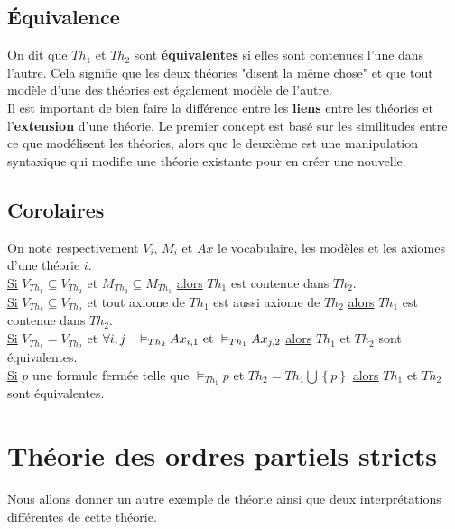 \subsection*{Équivalence}
On dit que $Th_1$ et $Th_2$ sont \textbf{équivalentes} si elles sont contenues l'une dans l'autre. Cela signifie que les deux théories "disent la même chose" et que tout modèle d'une des théories est également modèle de l'autre.\\

Il est important de bien faire la différence entre les \textbf{liens} entre les théories et l'\textbf{extension} d'une théorie. Le premier concept est basé sur les similitudes entre ce que modélisent les théories, alors que le deuxième est une manipulation syntaxique qui modifie une théorie existante pour en créer une nouvelle.

\subsection*{Corolaires}
On note respectivement $V_i$, $M_i$ et $Ax$ le vocabulaire, les modèles et les axiomes d'une théorie $i$. \\

\noindent \underline{Si} $V_{Th_1} \subseteq V_{Th_2}$ et $M_{Th_2} \subseteq M_{Th_1}$ \underline{alors} $Th_1$ est contenue dans $Th_2$. \\

\noindent \underline{Si} $V_{Th_1} \subseteq V_{Th_2}$ et tout axiome de $Th_1$ est aussi axiome de $Th_2$ \underline{alors} $Th_1$ est contenue dans $Th_2$. \\

\noindent \underline{Si} $V_{Th_1} = V_{Th_2}$ et $\forall i,j \hspace{0.3cm} \vDash_{Th_2} Ax_{i,1} \textrm{ et } \vDash_{Th_1} Ax_{j,2} $ \underline{alors} $Th_1$ et $Th_2$ sont équivalentes. \\

\noindent \underline{Si} $p$ une formule fermée telle que $\vDash_{Th_1} p$ et $Th_2 = Th_1 \bigcup \left\lbrace p \right\rbrace$ \underline{alors} $Th_1$ et $Th_2$ sont équivalentes. \\

\section{Théorie des ordres partiels stricts}

Nous allons donner un autre exemple de théorie ainsi que deux interprétations différentes de cette théorie.
